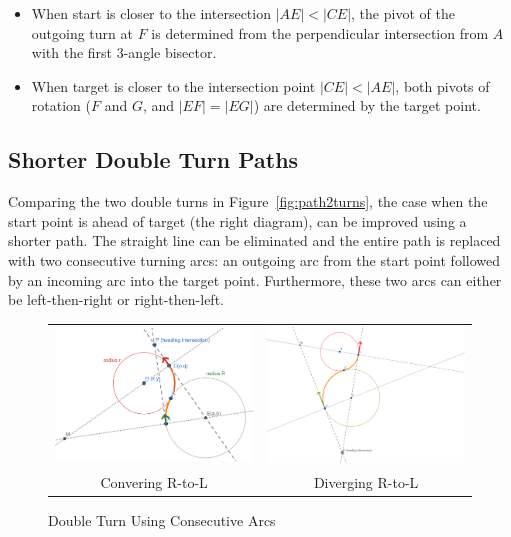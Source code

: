 \documentclass{article}
\begin{document}
\begin{itemize}
  \item When start is closer to the intersection $|AE| < |CE|$, the pivot of the
        outgoing turn at $F$ is determined from the perpendicular intersection from $A$
        with the first 3-angle bisector.
  \item When target is closer to the intersection point $|CE| < |AE|$, both
        pivots of rotation ($F$ and $G$, and $|EF| = |EG|$) are determined by the target point.
\end{itemize}

\subsection*{Shorter Double Turn Paths}
Comparing the two double turns in Figure~\ref{fig:path2turns},  the case when the start point
is ahead of target (the right diagram), can be improved using a shorter path.
The straight line can be eliminated and the entire path is replaced with two consecutive turning arcs: 
an outgoing arc from the start point
followed by an incoming arc into the target point. Furthermore, these two arcs can either be 
left-then-right or right-then-left.

\begin{figure}[hbt]
  \begin{tabular}{cc}
    \includegraphics[width=6cm]{screenshots/double-turns-right-left.png} & 
    \includegraphics[width=6cm]{screenshots/double-arcs-diverging-right-to-left.png}         \\
    Convering R-to-L                                                     & Diverging R-to-L
  \end{tabular}
  \caption{Double Turn Using Consecutive Arcs}
  \label{fig:double-RL}
\end{figure}
\end{document}
